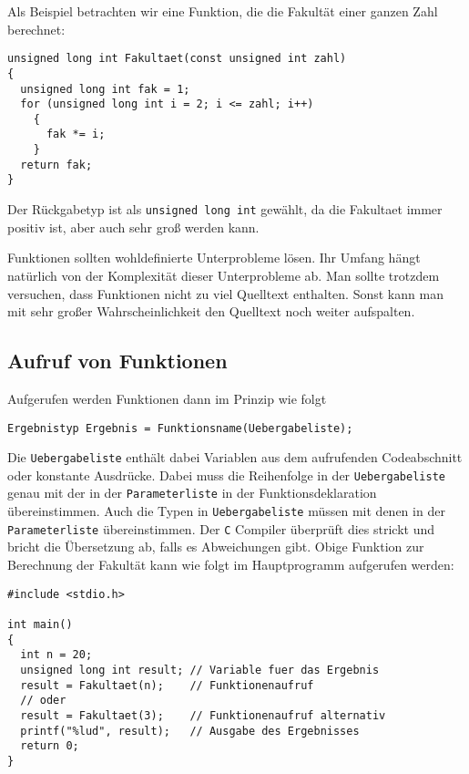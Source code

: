 Als Beispiel betrachten wir eine Funktion, die die Fakultät einer ganzen Zahl berechnet:

\begin{minipage}{\linewidth}
\begin{lstlisting}
unsigned long int Fakultaet(const unsigned int zahl)
{
  unsigned long int fak = 1;
  for (unsigned long int i = 2; i <= zahl; i++)
    {
      fak *= i;
    }
  return fak;
}
\end{lstlisting}
\end{minipage}
Der Rückgabetyp ist als \verb|unsigned long int| gewählt, da die Fakultaet immer positiv ist, aber auch sehr groß werden kann.

Funktionen sollten wohldefinierte Unterprobleme lösen.
Ihr Umfang hängt natürlich von der Komplexität dieser Unterprobleme ab.
Man sollte trotzdem versuchen, dass Funktionen nicht zu viel Quelltext enthalten.
Sonst kann man mit sehr großer Wahrscheinlichkeit den Quelltext noch weiter aufspalten.

\subsection{Aufruf von Funktionen}

Aufgerufen werden Funktionen dann im Prinzip wie folgt
\begin{lstlisting}
Ergebnistyp Ergebnis = Funktionsname(Uebergabeliste);
\end{lstlisting}
Die \verb|Uebergabeliste| enthält dabei Variablen aus dem aufrufenden Codeabschnitt oder konstante Ausdrücke.
Dabei muss die Reihenfolge in der \verb|Uebergabeliste| genau mit der in der \verb|Parameterliste| in der Funktionsdeklaration übereinstimmen.
Auch die Typen in \verb|Uebergabeliste| müssen mit denen in der \verb|Parameterliste| übereinstimmen.
Der \texttt{C} Compiler überprüft dies strickt und bricht die Übersetzung ab, falls es Abweichungen gibt.
Obige Funktion zur Berechnung der Fakultät kann wie folgt im Hauptprogramm aufgerufen werden:

\begin{minipage}{\linewidth}
\begin{lstlisting}
#include <stdio.h>

int main()
{
  int n = 20;
  unsigned long int result; // Variable fuer das Ergebnis
  result = Fakultaet(n);    // Funktionenaufruf
  // oder
  result = Fakultaet(3);    // Funktionenaufruf alternativ
  printf("%lud", result);   // Ausgabe des Ergebnisses
  return 0;
}
\end{lstlisting}
\end{minipage}

